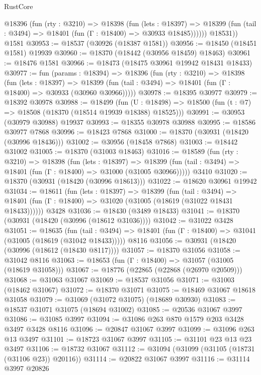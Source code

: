 \begin{lexlean}{RustCore}
\begin{coremodule}
          @18396
            (fun (rty : @3210) =>
            @18398
              (fun (lets : @18397) =>
              @18399 (fun (tail : @3494) => @18401 (fun (Γ : @18400) => @30933 @18485))))))
        @18531))
    @1581
@30953 := @18537 (@30926 (@18387 @1581))
@30956 := @18450 (@18451 @1581) @19939
@30960 := @18370 (@18442 (@30956 @18459) @18463)
@30961 := @18476 @1581
@30966 := @18473 (@18475 @30961 @19942 @18431 @18433)
@30977 := fun (params : @18394) =>
  @18396
    (fun (rty : @3210) =>
    @18398
      (fun (lets : @18397) =>
      @18399 (fun (tail : @3494) => @18401 (fun (Γ : @18400) => @30933 (@30960 @30966)))))
@30978 := @18395 @30977
@30979 := @18392 @30978
@30988 := @18499
    (fun (U : @18498) => @18500 (fun (t : @7) => @18508 (@18370 (@18514 @19939 @18388) @18525)))
@30991 := @30953 (@30979 @30988) @19937
@30993 := @18355 @30978 @30988
@30995 := @18586 @30977 @7868
@30996 := @18423 @7868
@31000 := @18370 (@30931 (@18420 (@30996 @18436)))
@31002 := @30956 (@18458 @7868)
@31003 := @18442 @31002
@31005 := @18370 (@31003 @18463)
@31016 := @18589
    (fun (rty : @3210) =>
    @18398
      (fun (lets : @18397) =>
      @18399 (fun (tail : @3494) => @18401 (fun (Γ : @18400) => @31000 (@31005 @30966)))))
    @3410
@31020 := @18370 (@30931 (@18420 (@30996 @18613)))
@31022 := @18620 @30961 @19942
@31034 := @18611
    (fun (lets : @18397) =>
    @18399
      (fun (tail : @3494) =>
      @18401 (fun (Γ : @18400) => @31020 (@31005 (@18619 (@31022 @18431 @18433))))))
    @3428
@31036 := @18430 (@3489 @18433)
@31041 := @18370 (@30931 (@18420 (@30996 (@18612 @31036))))
@31042 := @31022 @3428
@31051 := @18635
    (fun (tail : @3494) => @18401 (fun (Γ : @18400) => @31041 (@31005 (@18619 (@31042 @18433)))))
    @8116
@31056 := @30931 (@18420 (@30996 (@18612 (@18430 @8117))))
@31057 := @18370 @31056
@31058 := @31042 @8116
@31063 := @18653 (fun (Γ : @18400) => @31057 (@31005 (@18619 @31058)))
@31067 := @18776 (@22865 (@22868 (@26970 @20509)))
@31068 := @31063 @31067
@31069 := @18537 @31056
@31071 := @31003 (@18462 @31067)
@31072 := @18370 @31071
@31075 := @18469 @31067 @18618 @31058
@31079 := @31069 (@31072 @31075) (@18689 @30930)
@31083 := @18537 @31071 @31075 (@18694 @31002)
@31085 := @20536 @31067 @3997
@31086 := @31085 @3997
@31094 := @31086 @263 @870 @1579 @203 @3428 @3497 @3428 @8116
@31096 := @20847 @31067 @3997
@31099 := @31096 @263 @13 @3497
@31101 := @18723 @31067 @3997
@31105 := @31101 @23 @13 @23 @3497
@31106 := @18732 @31067
@31112 := @31094 (@31099 (@31105 (@18731 (@31106 @23)) @20116))
@31114 := @20822 @31067 @3997
@31116 := @31114 @3997 @20826

\end{coremodule}
\end{lexlean}
